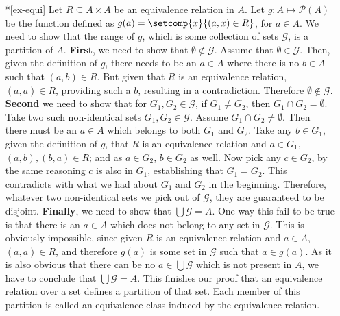 \documentclass[11pt]{article}
\begin{document}
\begin{enumerate}
\item[*\ref{ex-equi}] Let $R\subseteq A\times A$ be an equivalence relation in
$A$. Let $g: A \mapsto \mathcal{P}(A)$ be the function defined as $g(a) =
\setcomp{x}{(a,x) \in R}$, for $a\in A$. We need to show that the range of $g$,
which is some collection of sets $\mathcal{G}$, is a partition of $A$. {\bf
First}, we need to show that $\emptyset \not\in \mathcal{G}$. Assume that
$\emptyset \in \mathcal{G}$. Then, given the definition of $g$, there needs to
be an $a \in A$ where there is no $b \in A$ such that $(a,b) \in R$. But given
that $R$ is an equivalence relation, $(a,a) \in R$, providing such a $b$,
resulting in a contradiction. Therefore  $\emptyset \not\in \mathcal{G}$. {\bf
Second} we need to show that for $G_1, G_2 \in \mathcal{G}$, if $G_1 \neq G_2$,
then $G_1\cap G_2 = \emptyset$. Take two such non-identical sets $G_1, G_2 \in
\mathcal{G}$. Assume $G_1\cap G_2 \neq \emptyset$. Then there must be an $a \in
A$ which belongs to both $G_1$ and $G_2$. Take any $b \in G_1$, given the
definition of $g$,  that $R$ is an equivalence relation and $a\in G_1$, $(a,b),
(b,a) \in R$; and as $a \in G_2$, $b\in G_2$ as well. Now pick any $c\in G_2$,
by the same reasoning $c$ is also in $G_1$, establishing that $G_1 = G_2$. This
contradicts with what we had about $G_1$ and $G_2$ in the beginning. Therefore,
whatever two non-identical sets we pick out of $\mathcal{G}$, they are
guaranteed to be disjoint. {\bf Finally}, we need to show that $\bigcup
\mathcal{G} = A$. One way this fail to be true is that  there is an $a\in A$ which does
not belong to any set in $\mathcal{G}$. This is obviously impossible, since
given $R$ is an equivalence relation and $a\in A$, $(a,a) \in R$, and therefore
$g(a)$ is some set in $\mathcal{G}$ such that $a \in g(a)$. As it is also
obvious that there can be no $a \in \bigcup\mathcal{G}$ which is not present in
$A$, we have to conclude that $\bigcup
\mathcal{G} = A$. This finishes our proof that an equivalence relation over a
set defines a partition of that set. Each member of this partition is called an
equivalence class induced by the equivalence relation. 

\end{enumerate}




\end{document}
